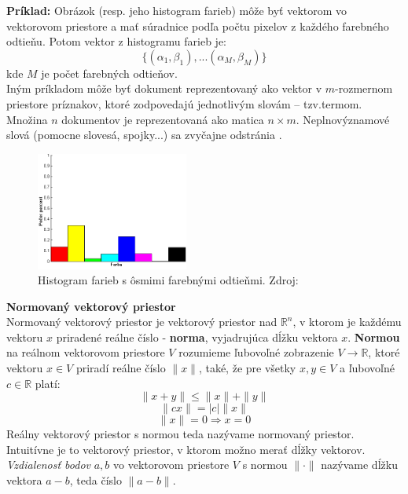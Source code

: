 \documentclass[12pt,a4paper,oneside]{fithesis2}
\begin{document}
\textbf{Príklad:}
Obrázok (resp. jeho histogram farieb) môže byť vektorom vo vektorovom priestore a mať súradnice podľa počtu pixelov z každého farebného odtieňu.
Potom vektor z histogramu farieb je:
\begin{equation*}
\{(\alpha_1,\beta_1),...(\alpha_M,\beta_M)\}
\end{equation*}
kde $M$ je počet farebných odtieňov. \\
Iným príkladom môže byť dokument reprezentovaný ako
vektor v $m$-rozmernom priestore príznakov, ktoré zodpovedajú jednotlivým slovám – tzv.termom. Množina $n$ dokumentov je reprezentovaná ako matica $n\times m$. Neplnovýznamové slová (pomocne slovesá, spojky...) sa zvyčajne odstránia \cite{vectorspace}. 

\begin{figure}[h']
  \centering
  \includegraphics[width=5cm]{obr/histogram.png}
  \caption{Histogram farieb s ôsmimi farebnými odtieňmi. Zdroj:\cite{histogram}}
  \label{fig:triangle}
\end{figure}  

\textbf{Normovaný vektorový priestor}\\
Normovaný vektorový priestor je vektorový priestor nad $\mathbb{R}^n$, v ktorom je každému vektoru $x$ priradené reálne číslo - \textbf{norma}, vyjadrujúca dĺžku vektora $x$. \textbf{Normou} na reálnom vektorovom priestore $V$ rozumieme ľubovoľné zobrazenie $V \rightarrow \mathbb{R}$, ktoré vektoru $x \in V$ priradí reálne číslo $\| x \|$, také, že pre všetky $x,y \in V$ a ľubovoľné $c \in \mathbb{R}$ platí:
\begin{equation*}
\| x + y \| \leq \|x\| + \|y\|
\end{equation*}
\begin{equation*}
\| cx \| = |c| \| x \|
\end{equation*}
\begin{equation*}
\|x\| = 0  \Rightarrow x = 0
\end{equation*}
Reálny vektorový priestor s normou teda nazývame normovaný priestor. Intuitívne je to vektorový priestor, v ktorom možno merať dĺžky vektorov. \textit{Vzdialenosť bodov} $a, b$ vo vektorovom priestore $V$ s normou $\| \cdot \|$ nazývame dĺžku vektora $a - b$, teda číslo $\|a-b\|$.
\end{document}
